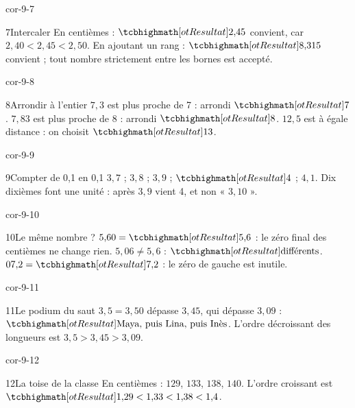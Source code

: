 \begin{blocLivre}{cor-9-7}\begin{corrige}{7}{Intercaler}
En centièmes : $\res{2{,}45}$ convient, car $2{,}40<2{,}45<2{,}50$. En ajoutant un rang : $\res{8{,}315}$ convient ; tout nombre strictement entre les bornes est accepté.
\end{corrige}\end{blocLivre}
\begin{blocLivre}{cor-9-8}\begin{corrige}{8}{Arrondir à l’entier}
$7{,}3$ est plus proche de 7 : arrondi $\res7$. $7{,}83$ est plus proche de 8 : arrondi $\res8$. $12{,}5$ est à égale distance : on choisit $\res{13}$.
\end{corrige}\end{blocLivre}
\begin{blocLivre}{cor-9-9}\begin{corrige}{9}{Compter de 0,1 en 0,1}
$3{,}7$ ; $3{,}8$ ; $3{,}9$ ; $\res{4}$ ; $4{,}1$. Dix dixièmes font une unité : après $3{,}9$ vient 4, et non « $3{,}10$ ».
\end{corrige}\end{blocLivre}
\begin{blocLivre}{cor-9-10}\begin{corrige}{10}{Le même nombre ?}
$5{,}60=\res{5{,}6}$ : le zéro final des centièmes ne change rien. $5{,}06\ne5{,}6$ : $\res{\text{différents}}$. $07{,}2=\res{7{,}2}$ : le zéro de gauche est inutile.
\end{corrige}\end{blocLivre}
\begin{blocLivre}{cor-9-11}\begin{corrige}{11}{Le podium du saut}
$3{,}5=3{,}50$ dépasse $3{,}45$, qui dépasse $3{,}09$ : $\res{\text{Maya, puis Lina, puis Inès}}$. L’ordre décroissant des longueurs est $3{,}5>3{,}45>3{,}09$.
\end{corrige}\end{blocLivre}
\begin{blocLivre}{cor-9-12}\begin{corrige}{12}{La toise de la classe}
En centièmes : $129$, $133$, $138$, $140$. L’ordre croissant est $\res{1{,}29<1{,}33<1{,}38<1{,}4}$.
\end{corrige}\end{blocLivre}
